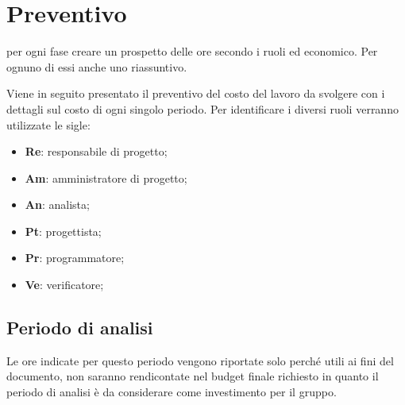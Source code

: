 \section{Preventivo} %
per ogni fase creare un prospetto delle ore secondo i ruoli ed economico. Per ognuno di essi anche uno riassuntivo.

Viene in seguito presentato il preventivo del costo del lavoro da svolgere con i dettagli sul costo di ogni singolo periodo.
Per identificare i diversi ruoli verranno utilizzate le sigle:
\begin{itemize}
	\item \textbf{Re}: responsabile di progetto;
	\item \textbf{Am}: amministratore di progetto;
	\item \textbf{An}: analista;
	\item \textbf{Pt}: progettista;
	\item \textbf{Pr}: programmatore;
	\item \textbf{Ve}: verificatore;
\end{itemize}
	\subsection{Periodo di analisi}
	Le ore indicate per questo periodo vengono riportate solo perché utili ai fini del documento, non saranno rendicontate nel budget finale richiesto in quanto il periodo di analisi è da considerare come investimento per il gruppo.
